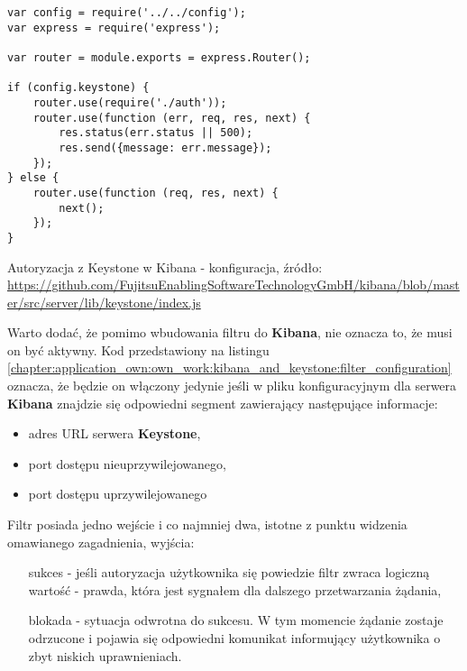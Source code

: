     \begin{listing}
        \begin{verbatim}
var config = require('../../config');
var express = require('express');

var router = module.exports = express.Router();

if (config.keystone) {
    router.use(require('./auth'));
    router.use(function (err, req, res, next) {
        res.status(err.status || 500);
        res.send({message: err.message});
    });
} else {
    router.use(function (req, res, next) {
        next();
    });
}
        \end{verbatim}
        \caption[Autoryzacja z Keystone w Kibana - konfiguracja]{Autoryzacja z Keystone w Kibana - konfiguracja, źródło: \url{https://github.com/FujitsuEnablingSoftwareTechnologyGmbH/kibana/blob/master/src/server/lib/keystone/index.js}}
        \label{chapter:application_own:own_work:kibana_and_keystone:filter_configuration}
    \end{listing}
    
    Warto dodać, że pomimo wbudowania filtru do \textbf{Kibana}, nie oznacza to, że musi on być aktywny. Kod
    przedstawiony na listingu \ref{chapter:application_own:own_work:kibana_and_keystone:filter_configuration} oznacza,
    że będzie on włączony jedynie jeśli w pliku konfiguracyjnym dla serwera \textbf{Kibana} znajdzie się odpowiedni
    segment zawierający następujące informacje:
    \begin{itemize}
        \item adres URL serwera \textbf{Keystone},
        \item port dostępu nieuprzywilejowanego,
        \item port dostępu uprzywilejowanego
    \end{itemize}
    
    Filtr posiada jedno wejście i co najmniej dwa, istotne z punktu widzenia omawianego zagadnienia, wyjścia:
    \begin{itemize}
        \item[sukces] - jeśli autoryzacja użytkownika się powiedzie filtr zwraca logiczną wartość - prawda,
        która jest sygnałem dla dalszego przetwarzania żądania,
        \item[blokada] - sytuacja odwrotna do sukcesu. W tym momencie żądanie zostaje odrzucone
        i pojawia się odpowiedni komunikat informujący użytkownika o zbyt niskich uprawnieniach.
    \end{itemize}
    

